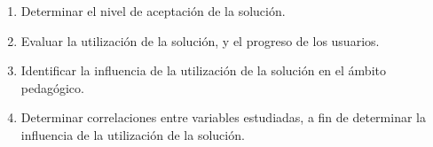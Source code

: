 \begin{enumerate}
    
\item Determinar el nivel de aceptación de la solución.

\item Evaluar la utilización de la solución, y el progreso de los usuarios.

\item Identificar la influencia de la utilización de la solución en el ámbito
    pedagógico.

\item Determinar correlaciones entre variables estudiadas, a fin de determinar
    la influencia de la utilización de la solución.
    
\end{enumerate}

